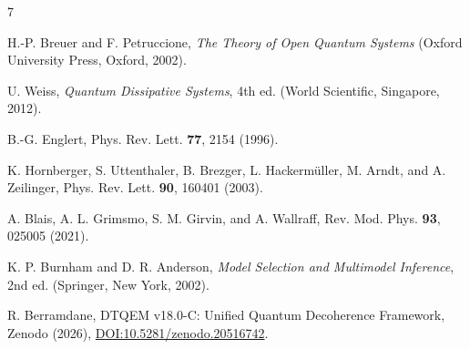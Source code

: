 \documentclass[aps,pra,reprint,amsmath,amssymb,superscriptaddress]{revtex4-2}
\begin{document}
\begin{thebibliography}{7}

H.-P. Breuer and F. Petruccione, \textit{The Theory of Open Quantum Systems} (Oxford University Press, Oxford, 2002).

U. Weiss, \textit{Quantum Dissipative Systems}, 4th ed. (World Scientific, Singapore, 2012).

B.-G. Englert, Phys. Rev. Lett. \textbf{77}, 2154 (1996).

K. Hornberger, S. Uttenthaler, B. Brezger, L. Hackerm\"uller, M. Arndt, and A. Zeilinger, Phys. Rev. Lett. \textbf{90}, 160401 (2003).

A. Blais, A. L. Grimsmo, S. M. Girvin, and A. Wallraff, Rev. Mod. Phys. \textbf{93}, 025005 (2021).

K. P. Burnham and D. R. Anderson, \textit{Model Selection and Multimodel Inference}, 2nd ed. (Springer, New York, 2002).

R. Berramdane, DTQEM v18.0-C: Unified Quantum Decoherence Framework, Zenodo (2026), \href{https://doi.org/10.5281/zenodo.20516742}{DOI:10.5281/zenodo.20516742}.

\end{thebibliography}
\end{document}
